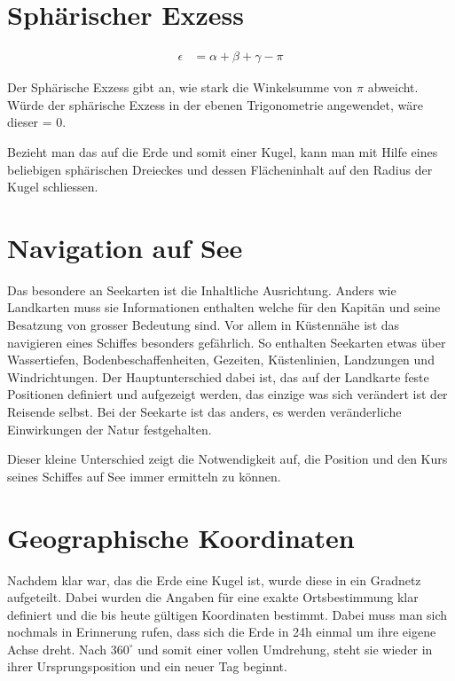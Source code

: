 \begin{refsection}
\section{Sphärischer Exzess}

\begin{align*}
\epsilon &= \alpha + \beta + \gamma - \pi
\end{align*}

Der Sphärische Exzess gibt an, wie stark die Winkelsumme von $\pi$ abweicht.
Würde der sphärische Exzess in der ebenen Trigonometrie angewendet, wäre dieser = 0. 


Bezieht man das auf die Erde und somit einer Kugel, kann man mit Hilfe eines beliebigen sphärischen Dreieckes und dessen Flächeninhalt auf den Radius der Kugel schliessen.

\section{Navigation auf See}
Das besondere an Seekarten ist die Inhaltliche Ausrichtung. Anders wie Landkarten muss sie Informationen enthalten welche für den Kapitän und seine Besatzung von grosser Bedeutung sind. Vor allem in Küstennähe ist das navigieren eines Schiffes besonders gefährlich. So enthalten Seekarten etwas über Wassertiefen, Bodenbeschaffenheiten, Gezeiten, Küstenlinien, Landzungen und Windrichtungen.
Der Hauptunterschied dabei ist, das auf der Landkarte feste Positionen definiert und aufgezeigt werden, das einzige was sich verändert ist der Reisende selbst. Bei der Seekarte ist das anders, es werden veränderliche Einwirkungen der Natur festgehalten.

Dieser kleine Unterschied zeigt die Notwendigkeit auf, die Position und den Kurs seines Schiffes auf See immer ermitteln zu können.


\section{Geographische Koordinaten}

Nachdem klar war, das die Erde eine Kugel ist, wurde diese in ein Gradnetz aufgeteilt. Dabei wurden die Angaben für eine exakte Ortsbestimmung klar definiert und die bis heute gültigen Koordinaten bestimmt.
Dabei muss man sich nochmals in Erinnerung rufen, dass sich die Erde in 24h einmal um ihre eigene Achse dreht. Nach $360 ^{\circ}$ 
und somit einer vollen Umdrehung, steht sie wieder in ihrer Ursprungsposition und ein neuer Tag beginnt.


\end{refsection}
